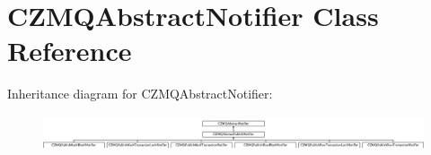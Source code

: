 \hypertarget{class_c_z_m_q_abstract_notifier}{}\section{C\+Z\+M\+Q\+Abstract\+Notifier Class Reference}
\label{class_c_z_m_q_abstract_notifier}
Inheritance diagram for C\+Z\+M\+Q\+Abstract\+Notifier\+:\begin{figure}[H]
\begin{center}
\leavevmode
\includegraphics[height=1.064639cm]{class_c_z_m_q_abstract_notifier}
\end{center}
\end{figure}
